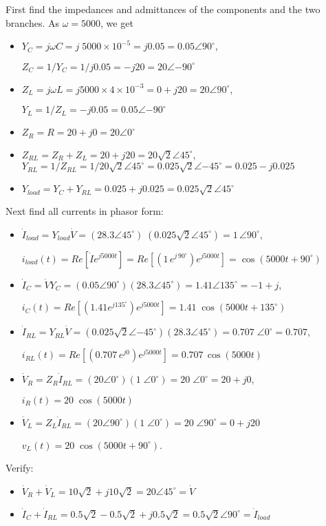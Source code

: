 First find the impedances and admittances of the components and the 
two branches. As $\omega=5000$, we get
\begin{itemize}
\item $Y_C=j\omega C=j\;5000\times 10^{-5}=j0.05=0.05\angle{90^\circ}$,

	$Z_C=1/Y_C=1/j0.05=-j20=20\angle{-90^\circ}$
\item $Z_L=j\omega L=j5000\times 4\times 10^{-3}=0+j20=20\angle{90^\circ}$,

	$Y_L=1/Z_L=-j0.05=0.05\angle{-90^\circ}$
\item $Z_R=R=20+j0=20\angle{0^\circ}$

\item $Z_{RL}=Z_R+Z_L=20+j20=20\sqrt{2}\angle{45^\circ}$,
	$Y_{RL}=1/Z_{RL}=1/20\sqrt{2}\angle{45^\circ}
	=0.025\sqrt{2}\angle{-45^\circ}=0.025-j0.025$

\item $Y_{load}=Y_C+Y_{RL}=0.025+j0.025=0.025\sqrt{2}\angle{45^\circ}$
\end{itemize}
Next find all currents in phasor form:
\begin{itemize}
\item $\dot{I}_{load}=Y_{load}\dot{V}=(28.3\angle{45^\circ})\;
  (0.025\sqrt{2}\angle{45^\circ})=1\,\angle{90^\circ}$,

  $i_{load}(t)=Re[\dot{I} e^{j5000t}]=Re[(1\,e^{j\,90^\circ}) e^{j5000t}]
  =\cos(5000t+90^\circ)$
\item $\dot{I}_C=\dot{V}Y_C=(0.05\angle{90^\circ})(28.3\angle{45^\circ})
  =1.41\angle{135^\circ}=-1+j$,  

  $i_C(t)=Re[ (1.41 e^{j 135^\circ}) e^{j5000t}]=1.41\;\cos(5000t+135^\circ)$

\item $\dot{I}_{RL}=Y_{RL}\dot{V}=(0.025\sqrt{2}\angle{-45^\circ})(28.3\angle{45^\circ})
  =0.707\;\angle{0^\circ}=0.707$,

  $i_{RL}(t)=Re[ (0.707\,e^{j0}) e^{j5000t} ]=0.707\,\cos(5000t)$

\item $\dot{V}_R=Z_R\dot{I}_{RL}=(20\angle{0^\circ})(1\;\angle{0^\circ})
  =20\;\angle{0^\circ}=20+j0$,
        
  $i_R(t)=20\;\cos(5000t)$

\item $\dot{V}_L=Z_L\dot{I}_{RL}=(20\angle{90^\circ})(1\;\angle{0^\circ})
  =20\;\angle{90^\circ}=0+j20$

  $v_L(t)=20\;\cos(5000t+90^\circ)$.
\end{itemize}
Verify: 
\begin{itemize}
\item $\dot{V}_R+\dot{V}_L=10\sqrt{2}+j10\sqrt{2}=20\angle{45^\circ}
	=\dot{V}$
\item $\dot{I}_C+\dot{I}_{RL}=0.5\sqrt{2}-0.5\sqrt{2}+j0.5\sqrt{2}
	=0.5\sqrt{2}\angle{90^\circ}=\dot{I}_{load}$
\end{itemize}

